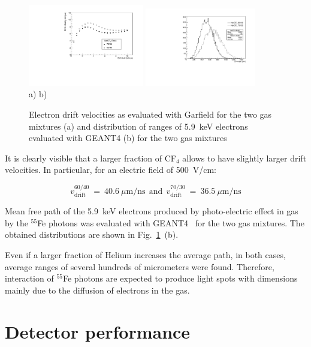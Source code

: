 \documentclass[a4paper,11pt]{article}
\begin{document}
\begin{figure}[ht]
\centering
\includegraphics[width=0.45\textwidth]{Figures/vdrift.pdf}
\includegraphics[width=0.43\textwidth]{Figures/ER_6keV.pdf}\\
\vspace{-0.3cm}
\mbox{a)} \hspace{6cm} \mbox{b)}
\vspace{-0.3cm}
\caption{Electron drift velocities as evaluated with Garfield for the two gas mixtures (a) and distribution of ranges of 5.9~keV electrons evaluated with GEANT4 (b) for the two gas mixtures}
\label{fig:drift_range}
\end{figure}

It is clearly visible that a larger fraction of CF$_4$ allows to have slightly larger drift velocities. In particular, for an electric field of 500~V/cm:

$$
v^{60/40}_{\mathrm{drift}}~=~40.6~\mu{\mathrm{m/ns}}
{\mathrm{~~and~~}} 
v^{70/30}_{\mathrm{drift}}~=~36.5~\mu{\mathrm{m/ns}}
$$

Mean free path of the 5.9~keV electrons produced by photo-electric effect in gas by the 
$^{55}$Fe photons was evaluated with GEANT4~\cite{bib:geant} for the two gas mixtures.
The obtained distributions are shown in Fig.~\ref{fig:drift_range}~(b).

Even if a larger fraction of Helium increases the average path, in both cases, average ranges of several hundreds of micrometers were found. Therefore, interaction of $^{55}$Fe photons are expected to produce light spots with dimensions mainly due to the diffusion of electrons in the gas.

\section{Detector performance}
\end{document}
